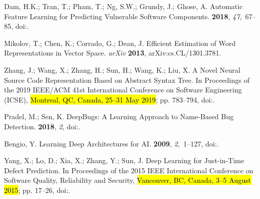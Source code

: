 \documentclass[mathematics,review,accept,moreauthors,pdftex]{Definitions/mdpi}
\begin{document}
\begin{thebibliography}{999}
{Dam}, H.K.; {Tran}, T.; {Pham}, T.; {Ng}, S.W.; {Grundy}, J.; {Ghose}, A.
\newblock Automatic Feature Learning for Predicting Vulnerable Software
  Components.
 {\bf 2018}, {\em
  47},~67--85,
\newblock
  doi:{\href{https://doi.org/10.1109/TSE.2018.2881961}{}}.

Mikolov, T.; Chen, K.; Corrado, G.; Dean, J.
\newblock Efficient Estimation of Word Representations in Vector Space.  \emph{arXiv} \textbf{2013}, arXiv:cs.CL/1301.3781.

{Zhang}, J.; {Wang}, X.; {Zhang}, H.; {Sun}, H.; {Wang}, K.; {Liu}, X.
\newblock A Novel Neural Source Code Representation Based on Abstract Syntax
  Tree.
\newblock  In Proceedings of the 2019 IEEE/ACM 41st International Conference on Software Engineering
  (ICSE), \hl{Montreal, QC, Canada, 25--31 May 2019}; pp. 783--794,
\newblock
  doi:{\href{https://doi.org/10.1109/ICSE.2019.00086}{}}.

Pradel, M.; Sen, K.
\newblock DeepBugs: A Learning Approach to Name-Based Bug Detection.
 {\bf 2018}, {\em 2},
\newblock
  doi:{\href{https://doi.org/10.1145/3276517}{}}.

Bengio, Y.
\newblock Learning Deep Architectures for AI.
 {\bf 2009}, {\em 2},~1–127,
\newblock
  doi:{\href{https://doi.org/10.1561/2200000006}{}}.

{Yang}, X.; {Lo}, D.; {Xia}, X.; {Zhang}, Y.; {Sun}, J.
\newblock Deep Learning for Just-in-Time Defect Prediction.
\newblock  In Proceedings of the 2015 IEEE International Conference on Software Quality, Reliability
  and Security, \hl{Vancouver, BC, Canada, 3--5 August 2015}; pp. 17--26,
\newblock
  doi:{\href{https://doi.org/10.1109/QRS.2015.14}{}}.


\end{thebibliography}
\end{document}
